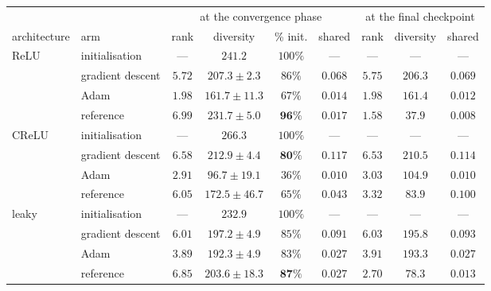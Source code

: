 \documentclass{article} %
\theoremstyle{plain}
\theoremstyle{definition}
\theoremstyle{remark}
\begin{document}
\begin{center}\small
\begin{tabular}{llcccc|ccc}
\toprule
 & & \multicolumn{4}{c|}{at the convergence phase} & \multicolumn{3}{c}{at the final checkpoint} \\
architecture & arm & rank & diversity & \% init. & shared & rank & diversity & shared \\
\midrule
ReLU  & initialisation   & ---             & $241.2$                   & $100\%$         & ---
                         & ---             & ---                       & --- \\
      & gradient descent & $5.72$          & $207.3 \pm 2.3$           & $86\%$          & $0.068$
                         & $5.75$          & $206.3$                   & $0.069$ \\
      & Adam             & $1.98$          & $161.7 \pm 11.3$          & $67\%$          & $0.014$
                         & $1.98$          & $161.4$                   & $0.012$ \\
      & reference        & $\mathbf{6.99}$ & $\mathbf{231.7 \pm 5.0}$  & $\mathbf{96\%}$ & $0.017$
                         & $1.58$          & $37.9$                    & $0.008$ \\
\midrule
CReLU & initialisation   & ---             & $266.3$                   & $100\%$         & ---
                         & ---             & ---                       & --- \\
      & gradient descent & $\mathbf{6.58}$ & $\mathbf{212.9 \pm 4.4}$  & $\mathbf{80\%}$ & $0.117$
                         & $6.53$          & $210.5$                   & $0.114$ \\
      & Adam             & $2.91$          & $96.7 \pm 19.1$           & $36\%$          & $0.010$
                         & $3.03$          & $104.9$                   & $0.010$ \\
      & reference        & $6.05$          & $172.5 \pm 46.7$          & $65\%$          & $0.043$
                         & $3.32$          & $83.9$                    & $0.100$ \\
\midrule
leaky & initialisation   & ---             & $232.9$                   & $100\%$         & ---
                         & ---             & ---                       & --- \\
      & gradient descent & $6.01$          & $197.2 \pm 4.9$           & $85\%$          & $0.091$
                         & $6.03$          & $195.8$                   & $0.093$ \\
      & Adam             & $3.89$          & $192.3 \pm 4.9$           & $83\%$          & $0.027$
                         & $3.91$          & $193.3$                   & $0.027$ \\
      & reference        & $\mathbf{6.85}$ & $\mathbf{203.6 \pm 18.3}$ & $\mathbf{87\%}$ & $0.027$
                         & $2.70$          & $78.3$                    & $0.013$ \\
\bottomrule
\end{tabular}
\end{center}
\end{document}
